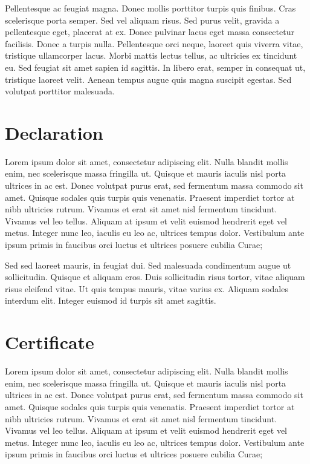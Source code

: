 \documentclass{article}[12pt,a4paper]
\begin{document}
Pellentesque ac feugiat magna. 
Donec mollis porttitor turpis quis finibus. 
Cras scelerisque porta semper. 
Sed vel aliquam risus. 
Sed purus velit, gravida a pellentesque eget, placerat at ex. 
Donec pulvinar lacus eget massa consectetur facilisis. 
Donec a turpis nulla. 
Pellentesque orci neque, laoreet quis viverra vitae, tristique ullamcorper lacus. 
Morbi mattis lectus tellus, ac ultricies ex tincidunt eu. 
Sed feugiat sit amet sapien id sagittis. 
In libero erat, semper in consequat ut, tristique laoreet velit. 
Aenean tempus augue quis magna suscipit egestas. 
Sed volutpat porttitor malesuada. 

\newpage
\section*{Declaration}

Lorem ipsum dolor sit amet, consectetur adipiscing elit. 
Nulla blandit mollis enim, nec scelerisque massa fringilla ut. 
Quisque et mauris iaculis nisl porta ultrices in ac est. 
Donec volutpat purus erat, sed fermentum massa commodo sit amet. 
Quisque sodales quis turpis quis venenatis. 
Praesent imperdiet tortor at nibh ultricies rutrum. 
Vivamus et erat sit amet nisl fermentum tincidunt. 
Vivamus vel leo tellus. 
Aliquam at ipsum et velit euismod hendrerit eget vel metus. 
Integer nunc leo, iaculis eu leo ac, ultrices tempus dolor. 
Vestibulum ante ipsum primis in faucibus orci luctus et ultrices posuere 
cubilia Curae;

Sed sed laoreet mauris, in feugiat dui. 
Sed malesuada condimentum augue ut sollicitudin. 
Quisque et aliquam eros. 
Duis sollicitudin risus tortor, vitae aliquam risus eleifend vitae. 
Ut quis tempus mauris, vitae varius ex. 
Aliquam sodales interdum elit. 
Integer euismod id turpis sit amet sagittis.


\newpage
\section*{Certificate}

Lorem ipsum dolor sit amet, consectetur adipiscing elit. 
Nulla blandit mollis enim, nec scelerisque massa fringilla ut. 
Quisque et mauris iaculis nisl porta ultrices in ac est. 
Donec volutpat purus erat, sed fermentum massa commodo sit amet. 
Quisque sodales quis turpis quis venenatis. 
Praesent imperdiet tortor at nibh ultricies rutrum. 
Vivamus et erat sit amet nisl fermentum tincidunt. 
Vivamus vel leo tellus. 
Aliquam at ipsum et velit euismod hendrerit eget vel metus. 
Integer nunc leo, iaculis eu leo ac, ultrices tempus dolor. 
Vestibulum ante ipsum primis in faucibus orci luctus et ultrices posuere 
cubilia Curae;
\end{document}
